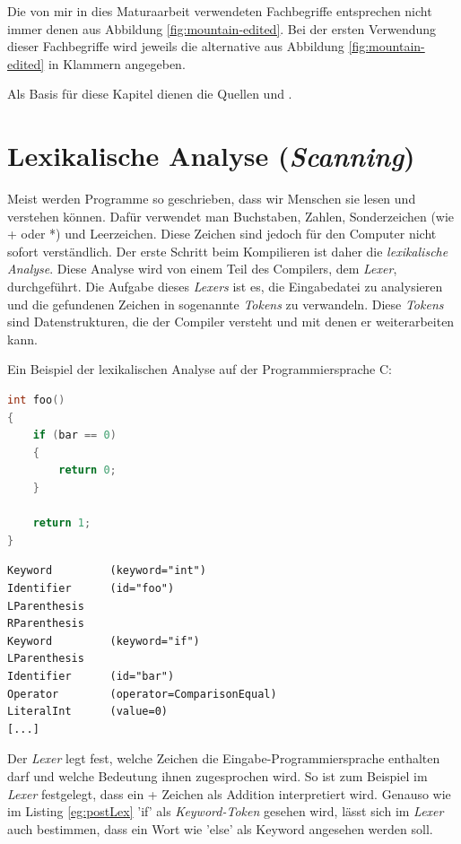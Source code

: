 Die von mir in dies Maturaarbeit verwendeten Fachbegriffe entsprechen nicht immer denen aus Abbildung \ref{fig:mountain-edited}.
Bei der ersten Verwendung dieser Fachbegriffe wird jeweils die alternative aus Abbildung \ref{fig:mountain-edited} in Klammern angegeben.

Als Basis für diese Kapitel dienen die Quellen \cite{CompilersDragon} und \cite{Lecture}.

\section{Lexikalische Analyse (\textit{Scanning})}
Meist werden Programme so geschrieben, dass wir Menschen sie lesen und verstehen können. Dafür verwendet man Buchstaben, Zahlen, Sonderzeichen (wie + oder *) und Leerzeichen.
Diese Zeichen sind jedoch für den Computer nicht sofort verständlich. Der erste Schritt beim Kompilieren ist daher die \textit{lexikalische Analyse}. Diese Analyse wird von einem Teil des Compilers, dem \textit{Lexer}, durchgeführt.
Die Aufgabe dieses \textit{Lexers} ist es, die Eingabedatei zu analysieren und die gefundenen Zeichen in sogenannte \textit{Tokens} zu verwandeln. Diese \textit{Tokens} sind Datenstrukturen, die der Compiler versteht und mit denen er weiterarbeiten kann.

Ein Beispiel der lexikalischen Analyse auf der Programmiersprache C:

\begin{lstlisting}[language=C, label=eg:preLex, caption=C code vor lexikalischer Analyse]
int foo()
{
    if (bar == 0)
    {
        return 0;
    }

    return 1;
}
\end{lstlisting}

\begin{lstlisting}[label=eg:postLex, caption=\textit{Tokens} nach lexikalischer Analyse]
Keyword         (keyword="int")
Identifier      (id="foo")
LParenthesis
RParenthesis
Keyword         (keyword="if")
LParenthesis
Identifier      (id="bar")
Operator        (operator=ComparisonEqual)
LiteralInt      (value=0)
[...]
\end{lstlisting}

Der \textit{Lexer} legt fest, welche Zeichen die Eingabe-Programmiersprache enthalten darf und welche Bedeutung ihnen zugesprochen wird. So ist zum Beispiel im \textit{Lexer} festgelegt, dass ein + Zeichen als Addition interpretiert wird.
Genauso wie im Listing \ref{eg:postLex} {\listingFont\selectfont 'if'} als \textit{Keyword-Token} gesehen wird, lässt sich im \textit{Lexer} auch bestimmen, dass ein Wort wie {\listingFont\selectfont 'else'} als Keyword angesehen werden soll.

